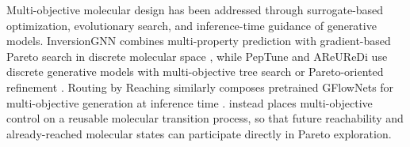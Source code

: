 Multi-objective molecular design has been addressed through surrogate-based optimization, evolutionary search, and inference-time guidance of generative models. InversionGNN combines multi-property prediction with gradient-based Pareto search in discrete molecular space \citep{niu2025inversiongnn}, while PepTune and AReUReDi use discrete generative models with multi-objective tree search or Pareto-oriented refinement \citep{tang2025peptune,chen2025areuredi}. Routing by Reaching similarly composes pretrained GFlowNets for multi-objective generation at inference time \citep{yoon2026routing}. \method{} instead places multi-objective control on a reusable molecular transition process, so that future reachability and already-reached molecular states can participate directly in Pareto exploration.
